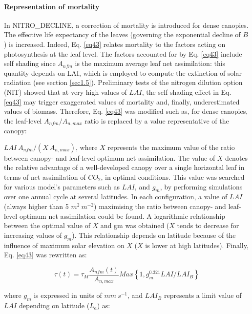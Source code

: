 {\paragraph{Representation of mortality}

In NITRO\_DECLINE, a correction of mortality is introduced for dense canopies. The effective life
expectancy of the leaves (governing the exponential decline of $B$) is increased. Indeed, Eq. \ref{eq43}
relates mortality to the factors acting on photosynthesis at the leaf level. The factors accounted for by
Eq. \ref{eq43} include self shading since $A_{nfm}$ is the maximum average leaf net assimilation: this quantity
depends on LAI, which is employed to compute the extinction of solar radiation (see section \ref{sec1.5}).
Preliminary tests of the nitrogen dilution option (NIT) showed that at very high values of $LAI$, the self
shading effect in Eq. \ref{eq43} may trigger exaggerated values of mortality and, finally, underestimated
values of biomass. Therefore, Eq. \ref{eq43} was modified such as, for dense canopies, the leaf-level
$A_{nfm}/A_{n,max}$ ratio is replaced by a value representative of the canopy:

$LAI ~A_{nfm}/(X ~A_{n,max})$, where $X$ represents the maximum value of the ratio between canopy- and leaf-level
optimum net assimilation. The value of $X$ denotes the relative advantage of a well-developed canopy
over a single horizontal leaf in terms of net assimilation of $CO_{2}$, in optimal conditions. This value was
searched for various model’s parameters such as $LAI$, and $g_{m}$, by performing simulations over one
annual cycle at several latitudes. In each configuration, a value of $LAI$ (always higher than 5 $m^{2} ~m^{-2}$)
maximising the ratio between canopy- and leaf-level optimum net assimilation could be found. A
logarithmic relationship between the optimal value of $X$ and gm was obtained ($X$ tends to decrease for
increasing values of $g_{m}$). This relationship depends on latitude because of the influence of maximum
solar elevation on $X$ ($X$ is lower at high latitudes). Finally, Eq. \ref{eq43} was rewritten as:

\begin{equation}
\tau (t) = \tau_{M} \frac{A_{nfm}(t)}{A_{n,max}} Max \left \{ 1, g_{m}^{0.321}LAI/LAI_{B}            \right \}
\end{equation}

where $g_{m}$ is expressed in units of $mm ~s^{-1}$, and $LAI_{B}$ represents a limit value of $LAI$ depending on
latitude ($L_{a}$) as:

}
